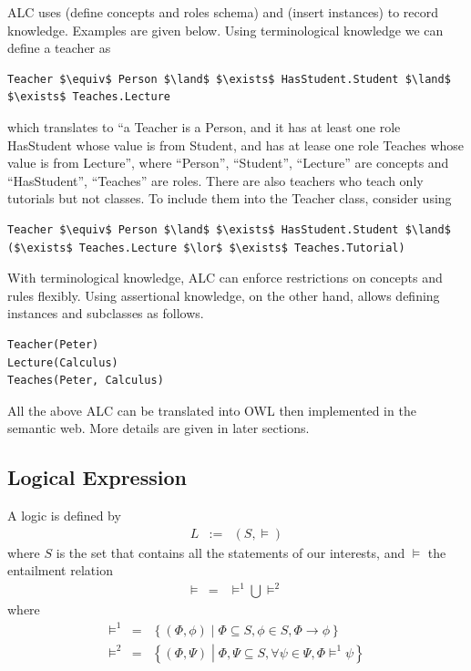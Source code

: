 ALC uses  (define concepts and roles schema) and  (insert instances) to record knowledge. Examples are given below. Using terminological knowledge we can define a teacher as
\begin{lstlisting}[mathescape=true]
Teacher $\equiv$ Person $\land$ $\exists$ HasStudent.Student $\land$ $\exists$ Teaches.Lecture
\end{lstlisting}
which translates to ``a Teacher is a Person, and it has at least one role HasStudent whose value is from Student, and has at lease one role Teaches whose value is from Lecture'', where ``Person'', ``Student'', ``Lecture'' are concepts and ``HasStudent'', ``Teaches'' are roles. There are also teachers who teach only tutorials but not classes. To include them into the Teacher class, consider using
\begin{lstlisting}[mathescape=true]
Teacher $\equiv$ Person $\land$ $\exists$ HasStudent.Student $\land$ ($\exists$ Teaches.Lecture $\lor$ $\exists$ Teaches.Tutorial)
\end{lstlisting}
With terminological knowledge, ALC can enforce restrictions on concepts and rules flexibly. Using assertional knowledge, on the other hand, allows defining instances and subclasses as follows.
\begin{lstlisting}
Teacher(Peter)
Lecture(Calculus)
Teaches(Peter, Calculus)
\end{lstlisting}

All the above ALC can be translated into OWL then implemented in the semantic web. More details are given in later sections.

\subsection{Logical Expression}

A logic is defined by 
\begin{eqnarray}
	L&:=& (S, \models) \nonumber
\end{eqnarray}
where $S$ is the set that contains all the statements of our interests, and $\models$ the entailment relation
\begin{eqnarray}
	\models &=& \models^1 \bigcup \models^2 \nonumber
\end{eqnarray}
where
\begin{eqnarray}
	\models^1 &=& \left\{(\Phi,\phi)\middle| \Phi \subseteq S, \phi\in S, \Phi\rightarrow \phi\right\} \label{eq:logicentailment} \\
	\models^2 &=& \left\{(\Phi, \Psi)\middle| \Phi, \Psi \subseteq S, \forall \psi \in \Psi, \Phi \models^1 \psi \right\} \label{eq:compoundlogicentailment}
\end{eqnarray}


